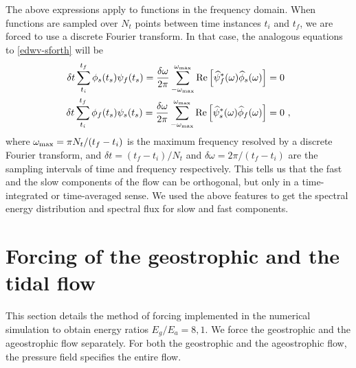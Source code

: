 \documentclass[../Rajarshi-thesis-draft.tex]{subfiles}
\begin{document}
The above expressions apply to functions in the frequency domain. When functions are sampled over $N_t$ points between time instances $t_i$ and $t_f$, we are forced to use a discrete Fourier transform. In that case, the analogous equations to \eqref{edwv-sforth} will be
\begin{align}
 \label{edwv-sfft}
 \begin{split}
 \delta t\sum\limits_{t_i}^{t_f} \phi_s(t_s)\psi_f(t_s) = \frac{\delta \omega}{2\pi}\sum\limits_{-\omega_{\operatorname{max}}}^{\omega_{\operatorname{max}}} \operatorname{Re}\left[\widehat{\psi}_f^*(\omega) \widehat{\phi}_s(\omega) \right] &= 0 \\
 \delta t\sum\limits_{t_i}^{t_f} \phi_f(t_s)\psi_s(t_s) = \frac{\delta \omega}{2\pi}\sum\limits_{-\omega_{\operatorname{max}}}^{\omega_{\operatorname{max}}} \operatorname{Re}\left[\widehat{\psi}_s^*(\omega) \widehat{\phi}_f(\omega) \right] &= 0 \ ,
\end{split}
\end{align}
where $\omega_{\operatorname{max}} = \pi N_t/(t_f - t_i)$ is the maximum frequency resolved by a discrete Fourier transform, and $\delta t = (t_f - t_i)/N_t$ and $\delta \omega = 2\pi/(t_f - t_i)$ are the sampling intervals of time and frequency respectively. This tells us that the fast and the slow components of the flow can be orthogonal, but only in a time-integrated or time-averaged sense. We used the above features to get the spectral energy distribution and spectral flux for slow and fast components. 

 
\section{Forcing of the geostrophic and the tidal flow}\label{edwv-fdets}
This section details the method of forcing implemented in the numerical simulation to obtain energy ratios $E_g/E_a= 8,1$. We force the geostrophic and the ageostrophic flow separately. For both the geostrophic and the ageostrophic flow, the pressure field specifies the entire flow.
\end{document}
